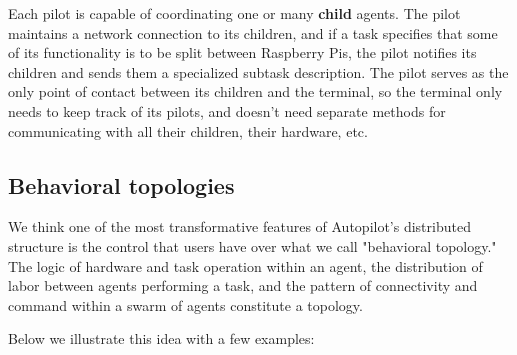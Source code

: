 \documentclass[nohyper, justified, notitlepage, marginals=raggedright,twoside=false,debug]{tufte-autopilot}
\begin{document}
Each pilot is capable of coordinating one or many \textbf{child} agents. The pilot maintains a network connection to its children, and if a task specifies that some of its functionality is to be split between Raspberry Pis, the pilot notifies its children and sends them a specialized subtask description. The pilot serves as the only point of contact between its children and the terminal, so the terminal only needs to keep track of its pilots, and doesn't need separate methods for communicating with all their children, their hardware, etc.

\subsection{Behavioral topologies}
\label{sec:topology}

We think one of the most transformative features of Autopilot's distributed structure is the control that users have over what we call "behavioral topology." The logic of hardware and task operation within an agent, the distribution of labor between agents performing a task, and the pattern of connectivity and command within a swarm of agents constitute a topology. 

Below we illustrate this idea with a few examples:

\clearpage
\end{document}
